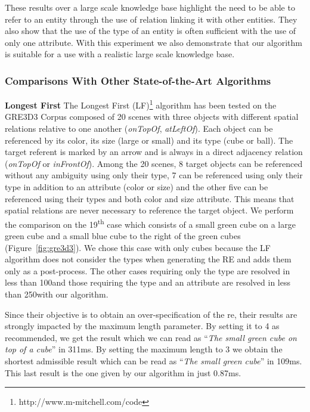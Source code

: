 \documentclass[a4paper,11pt,twoside]{StyleThese}
\begin{document}
These results over a large scale knowledge base highlight the need to be able to refer to an entity through the use of relation linking it with other entities. They also show that the use of the type of an entity is often sufficient with the use of only one attribute. With this experiment we also demonstrate that our algorithm is suitable for a use with a realistic large scale knowledge base.

\subsubsection{Comparisons With Other State-of-the-Art Algorithms}
\label{subsubsec:REGcomparisons}

\textbf{Longest First} The Longest First (LF)\footnote{http://www.m-mitchell.com/code} algorithm \cite{viethen2013graphs} has been tested on the GRE3D3 Corpus composed of 20 scenes with three objects with different spatial relations relative to one another (\textit{onTopOf}, \textit{atLeftOf}). Each object can be referenced by its color, its size (large or small) and its type (cube or ball). The target referent is marked by an arrow and is always in a direct adjacency relation (\textit{onTopOf} or \textit{inFrontOf}).
Among the 20 scenes, 8 target objects can be referenced without any ambiguity using only their type, 7 can be referenced using only their type in addition to an attribute (color or size) and the other five can be referenced using their types and both color and size attribute. This means that spatial relations are never necessary to reference the target object. 
We perform the comparison on the 19\textsuperscript{th} case which consists of a small green cube on a large green cube and a small blue cube to the right of the green cubes (Figure~\ref{fig:gre3d3}). We chose this case with only cubes because the LF algorithm does not consider the types when generating the RE and adds them only as a post-process. The other cases requiring only the type are resolved in less than 100\us and those requiring the type and an attribute are resolved in less than 250\us with our algorithm.

Since their objective is to obtain an over-specification of the \acrshort{re}, their results are strongly impacted by the maximum length parameter. By setting it to 4 as recommended, we get the result which we can read as ``\textit{The small green cube on top of a cube}'' in 311ms. By setting the maximum length to 3 we obtain the shortest admissible result which can be read as ``\textit{The small green cube}'' in 109ms. This last result is the one given by our algorithm in just 0.87ms.
\end{document}
